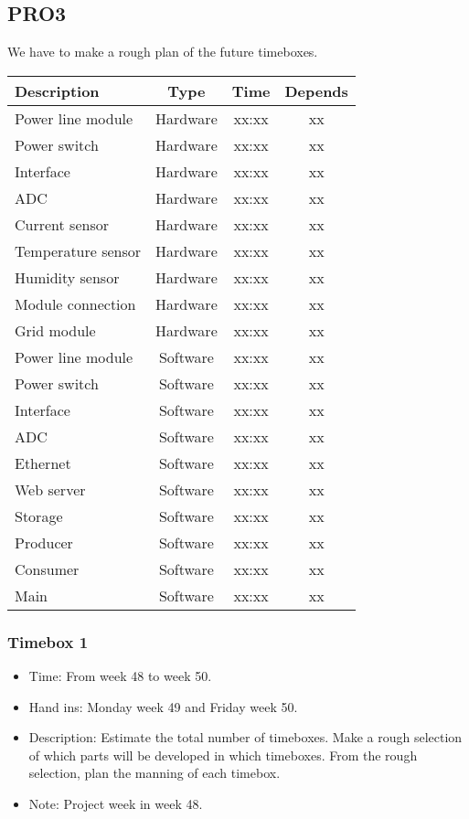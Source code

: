\documentclass[10pt,a4paper]{article}
\begin{document}
\subsection{PRO3}
We have to make a rough plan of the future timeboxes.\\
\begin{tabular}{ | l | c | c | c |}
\hline
Description					& Type		& Time		& Depends\\\hline
Power line module			& Hardware	& xx:xx		& xx\\\hline
Power switch				& Hardware	& xx:xx		& xx\\\hline
Interface					& Hardware	& xx:xx		& xx\\\hline
ADC							& Hardware	& xx:xx		& xx\\\hline
Current sensor				& Hardware	& xx:xx		& xx\\\hline
Temperature sensor			& Hardware	& xx:xx		& xx\\\hline
Humidity sensor				& Hardware	& xx:xx		& xx\\\hline
Module connection			& Hardware	& xx:xx		& xx\\\hline
Grid module					& Hardware	& xx:xx		& xx\\\hline
Power line module			& Software	& xx:xx		& xx\\\hline
Power switch				& Software	& xx:xx		& xx\\\hline
Interface					& Software	& xx:xx		& xx\\\hline
ADC							& Software	& xx:xx		& xx\\\hline
Ethernet					& Software	& xx:xx		& xx\\\hline
Web server					& Software	& xx:xx		& xx\\\hline
Storage						& Software	& xx:xx		& xx\\\hline
Producer					& Software	& xx:xx		& xx\\\hline
Consumer					& Software	& xx:xx		& xx\\\hline
Main						& Software	& xx:xx		& xx\\\hline
\end{tabular}
\subsubsection{Timebox 1}
\begin{itemize}
\item Time: From week 48 to week 50.
\item Hand ins: Monday week 49 and Friday week 50.
\item Description: Estimate the total number of timeboxes. Make a rough selection of which parts will be developed in which timeboxes. From the rough selection, plan the manning of each timebox.
\item Note: Project week in week 48.
\end{itemize}
\end{document}
